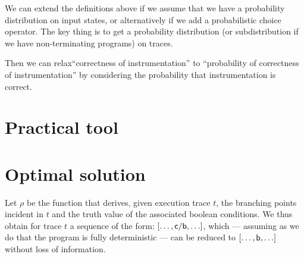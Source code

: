 \documentclass[]{article}
\begin{document}
We can extend the definitions above if we assume that we have a
probability distribution on input states, or alternatively if we add a
probabilistic choice operator. The key thing is to get a probability
distribution (or subdistribution if we have non-terminating programs)
on traces.

Then we can relax``correctness of instrumentation'' to ``probability of correctness of
instrumentation'' by considering the probability that instrumentation
is correct. 

\section{Practical tool}

\section{Optimal solution}

Let $\rho$ be the function that derives, given execution trace $t$, the branching points incident in $t$ and the truth value of the associated boolean conditions. We thus obtain for trace $t$ a sequence of the form: $[ \ldots , {\sf c}/{\sf b}, \ldots ]$, which --- assuming as we do that the program is fully deterministic --- can be reduced to $[ \ldots, {\sf b}, \ldots]$ without loss of information.
\end{document}
